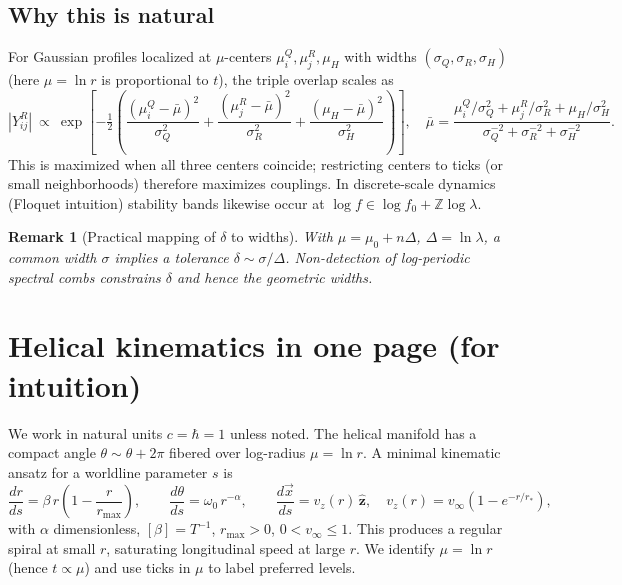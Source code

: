\documentclass[11pt]{article}
\newtheorem{remark}{Remark}
\newcommand{\Z}{\mathbb{Z}}
\begin{document}
\subsection{Why this is natural}
For Gaussian profiles localized at \(\mu\)-centers \( \mu^Q_i,\mu^R_j,\mu_H\) with widths \((\sigma_Q,\sigma_R,\sigma_H)\) (here \(\mu=\ln r\) is proportional to \(t\)), the triple overlap scales as
\begin{equation}\label{eq:overlap}
|Y^R_{ij}|\ \propto\ \exp\!\left[
-\tfrac12\!\left(\frac{(\mu^Q_i-\bar\mu)^2}{\sigma_Q^2}+
\frac{(\mu^R_j-\bar\mu)^2}{\sigma_R^2}+
\frac{(\mu_H-\bar\mu)^2}{\sigma_H^2}\right)\right],\quad
\bar\mu=\frac{\mu^Q_i/\sigma_Q^2+\mu^R_j/\sigma_R^2+\mu_H/\sigma_H^2}{\sigma_Q^{-2}+\sigma_R^{-2}+\sigma_H^{-2}}.
\end{equation}
This is maximized when all three centers coincide; restricting centers to ticks (or small neighborhoods) therefore maximizes couplings.
In discrete-scale dynamics (Floquet intuition) stability bands likewise occur at \(\log f\in \log f_0 + \Z\log\lambda\).

\begin{remark}[Practical mapping of \(\delta\) to widths]
With \(\mu=\mu_0+n\Delta\), \(\Delta=\ln\lambda\), a common width \(\sigma\) implies a tolerance \(\delta\sim \sigma/\Delta\).
Non-detection of log-periodic spectral combs constrains \(\delta\) and hence the geometric widths.
\end{remark}

\section{Helical kinematics in one page (for intuition)}
We work in natural units \(c=\hbar=1\) unless noted. The helical manifold has a compact angle \(\theta\sim \theta+2\pi\) fibered over log-radius \(\mu=\ln r\).
A minimal kinematic ansatz for a worldline parameter \(s\) is
\begin{equation}
\frac{dr}{ds}= \beta\, r\left(1-\frac{r}{r_{\max}}\right),\qquad
\frac{d\theta}{ds}= \omega_0\, r^{-\alpha},\qquad
\frac{d\vec x}{ds}= v_z(r)\,\hat{\mathbf z},\quad v_z(r)=v_\infty\!\left(1-e^{-r/r_*}\right),
\end{equation}
with \(\alpha\) dimensionless, \([\beta]=T^{-1}\), \(r_{\max}>0\), \(0<v_\infty\le 1\).
This produces a regular spiral at small \(r\), saturating longitudinal speed at large \(r\).
We identify \(\mu=\ln r\) (hence \(t\propto \mu\)) and use ticks in \(\mu\) to label preferred levels.
\end{document}
